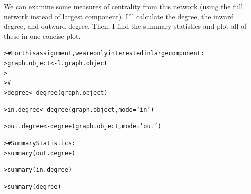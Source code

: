 \documentclass[12pt]{article}\usepackage[]{graphicx}\usepackage[]{color}
\makeatletter
\newcommand{\hlstr}[1]{\textcolor[rgb]{0.82,0.78,0.62}{#1}}%
\newcommand{\hlcom}[1]{\textcolor[rgb]{0.404,0.408,0.42}{#1}}%
\newcommand{\hlstd}[1]{\textcolor[rgb]{0.882,0.878,0.898}{#1}}%
\newcommand{\hlkwb}[1]{\textcolor[rgb]{0.902,0.675,0.196}{#1}}%
\newcommand{\hlkwc}[1]{\textcolor[rgb]{0.812,0.522,0.388}{#1}}%
\newcommand{\hlkwd}[1]{\textcolor[rgb]{0.733,0.388,0.812}{#1}}%
\newenvironment{kframe}{%
 \def\at@end@of@kframe{}%
 \ifinner\ifhmode%
  \def\at@end@of@kframe{\end{minipage}}%
  \begin{minipage}{\columnwidth}%
 \fi\fi%
 \def\FrameCommand##1{\hskip\@totalleftmargin \hskip-\fboxsep
 \colorbox{shadecolor}{##1}\hskip-\fboxsep
     \hskip-\linewidth \hskip-\@totalleftmargin \hskip\columnwidth}%
 \MakeFramed {\advance\hsize-\width
   \@totalleftmargin\z@ \linewidth\hsize
   \@setminipage}}%
 {\par\unskip\endMakeFramed%
 \at@end@of@kframe}
\newenvironment{knitrout}{}{} %
\makeatother
\begin{document}
\begin{flushleft}
We can examine some measures of centrality from this network (using the full network instead of largest component). I'll calculate the degree, the inward degree, and outward degree. Then, I find the summary statistics and plot all of these in one concise plot.

\begin{center}
\begin{knitrout}
\color{fgcolor}\begin{kframe}
\begin{alltt}
\hlstd{> }\hlcom{# For this assignment, we are only interested in large component:}
\hlstd{> }\hlstd{graph.object} \hlkwb{<-} \hlstd{l.graph.object}
\hlstd{> }
\hlstd{> }\hlcom{# --}
\hlstd{> }\hlstd{degree} \hlkwb{<-} \hlkwd{degree}\hlstd{(graph.object)}
\end{alltt}


{\ttfamily\noindent\bfseries\color{errorcolor}{\#\# Error in FUN(X[[i]], ...): as.edgelist.sna input must be an adjacency matrix/array, edgelist matrix, network, or sparse matrix, or list thereof.}}\begin{alltt}
\hlstd{> }\hlstd{in.degree} \hlkwb{<-} \hlkwd{degree}\hlstd{(graph.object,} \hlkwc{mode}\hlstd{=}\hlstr{'in'}\hlstd{)}
\end{alltt}


{\ttfamily\noindent\bfseries{}}\begin{alltt}
\hlstd{> }\hlstd{out.degree} \hlkwb{<-} \hlkwd{degree}\hlstd{(graph.object,} \hlkwc{mode}\hlstd{=}\hlstr{'out'}\hlstd{)}
\end{alltt}


{\ttfamily\noindent\bfseries{}}\begin{alltt}
\hlstd{> }\hlcom{# Summary Statistics:}
\hlstd{> }\hlkwd{summary}\hlstd{(out.degree)}
\end{alltt}


{\ttfamily\noindent\bfseries\color{errorcolor}{\#\# Error in h(simpleError(msg, call)): error in evaluating the argument 'object' in selecting a method for function 'summary': object 'out.degree' not found}}\begin{alltt}
\hlstd{> }\hlkwd{summary}\hlstd{(in.degree)}
\end{alltt}


{\ttfamily\noindent\bfseries\color{errorcolor}{\#\# Error in h(simpleError(msg, call)): error in evaluating the argument 'object' in selecting a method for function 'summary': object 'in.degree' not found}}\begin{alltt}
\hlstd{> }\hlkwd{summary}\hlstd{(degree)}
\end{alltt}



\end{kframe}
\end{knitrout}
\end{center}
\end{flushleft}
\end{document}

